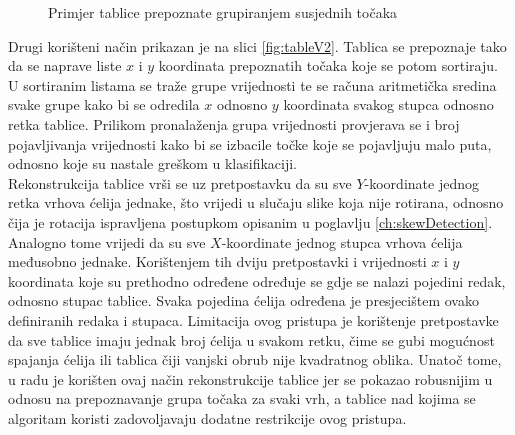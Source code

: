 \documentclass[times, utf8, zavrsni, numeric]{fer}
\begin{document}
\begin{figure}[!ht]
    \centering
    \captionsetup{justification=centering}
    \caption{Primjer tablice prepoznate grupiranjem susjednih točaka}
    \label{fig:tableV1}
\end{figure}

Drugi korišteni način prikazan je na slici \ref{fig:tableV2}.
Tablica se prepoznaje tako da se naprave liste $x$ i $y$ koordinata prepoznatih točaka koje se potom sortiraju.
U sortiranim listama se traže grupe vrijednosti te se računa aritmetička sredina svake grupe kako bi se odredila $x$ odnosno $y$ koordinata svakog stupca odnosno retka tablice. 
Prilikom pronalaženja grupa vrijednosti provjerava se i broj pojavljivanja vrijednosti kako bi se izbacile točke koje se pojavljuju malo puta, odnosno koje su nastale greškom u klasifikaciji.\\

Rekonstrukcija tablice vrši se uz pretpostavku da su sve $Y$-koordinate jednog retka vrhova ćelija jednake, što vrijedi u slučaju slike koja nije rotirana, odnosno čija je rotacija ispravljena postupkom opisanim u poglavlju \ref{ch:skewDetection}.
Analogno tome vrijedi da su sve $X$-koordinate jednog stupca vrhova ćelija međusobno jednake.
Korištenjem tih dviju pretpostavki i vrijednosti $x$ i $y$ koordinata koje su prethodno određene određuje se gdje se nalazi pojedini redak, odnosno stupac tablice.
Svaka pojedina ćelija određena je presjecištem ovako definiranih redaka i stupaca.
Limitacija ovog pristupa je korištenje pretpostavke da sve tablice imaju jednak broj ćelija u svakom retku, čime se gubi mogućnost spajanja ćelija ili tablica čiji vanjski obrub nije kvadratnog oblika.
Unatoč tome, u radu je korišten ovaj način rekonstrukcije tablice jer se pokazao robusnijim u odnosu na prepoznavanje grupa točaka za svaki vrh, a tablice nad kojima se algoritam koristi zadovoljavaju dodatne restrikcije ovog pristupa.\\
\end{document}

